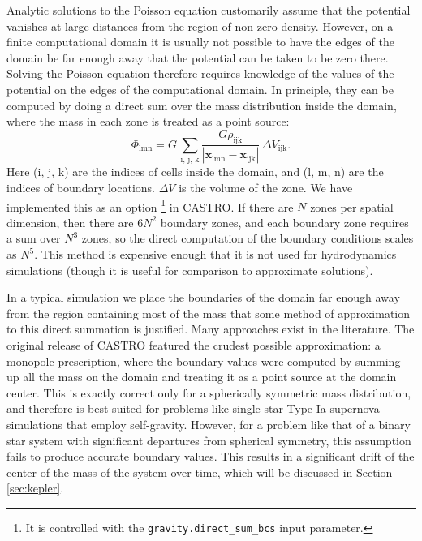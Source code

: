 \documentclass[12pt,preprint]{aastex}
\begin{document}
Analytic solutions to the Poisson equation customarily assume that the potential vanishes at large distances from the region of non-zero density. However, on a finite computational domain it is usually not possible to have the edges of the domain be far enough away that the potential can be taken to be zero there. Solving the Poisson equation therefore requires knowledge of the values of the potential on the edges of the computational domain. In principle, they can be computed by doing a direct sum over the mass distribution inside the domain, where the mass in each zone is treated as a point source:
\begin{equation}
  \Phi_{\text{lmn}} = G\, \sum_{\text{i, j, k}} \frac{G \rho_{\text{ijk}}}{|\mathbf{x}_{\text{lmn}} - \mathbf{x}_{\text{ijk}}|}\, \Delta V_{\text{ijk}}.\label{direct_sum}
\end{equation}
Here (i, j, k) are the indices of cells inside the domain, and (l, m, n) are the indices of boundary locations. $\Delta V$ is the volume of the zone. We have implemented this as an option \footnote{It is controlled with the \texttt{gravity.direct\_sum\_bcs} input parameter.} in CASTRO. If there are $N$ zones per spatial dimension, then there are $6 N^2$ boundary zones, and each boundary zone requires a sum over $N^3$ zones, so the direct computation of the boundary conditions scales as $N^5$.  This method is expensive enough that it is not used for hydrodynamics simulations (though it is useful for comparison to approximate solutions).

In a typical simulation we place the boundaries of the domain far enough away from the region containing most of the mass that some method of approximation to this direct summation is justified. Many approaches exist in the literature. The original release of CASTRO featured the crudest possible approximation: a monopole prescription, where the boundary values were computed by summing up all the mass on the domain and treating it as a point source at the domain center. This is exactly correct only for a spherically symmetric mass distribution, and therefore is best suited for problems like single-star Type Ia supernova simulations that employ self-gravity. However, for a problem like that of a binary star system with significant departures from spherical symmetry, this assumption fails to produce accurate boundary values. This results in a significant drift of the center of the mass of the system over time, which will be discussed in Section \ref{sec:kepler}.
\end{document}
